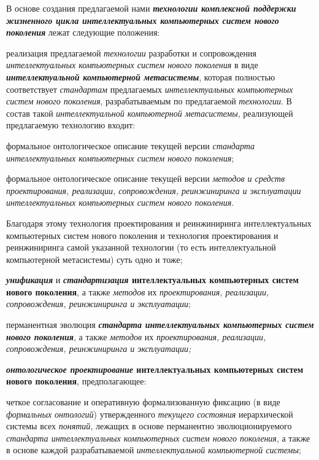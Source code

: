 В основе создания предлагаемой нами \textbf{\textit{технологии комплексной поддержки жизненного цикла интеллектуальных компьютерных систем нового поколения}} лежат следующие положения:
\begin{textitemize}
	\item реализация предлагаемой \textit{технологии} разработки и сопровождения \textit{интеллектуальных компьютерных систем нового поколения} в виде \textbf{\textit{интеллектуальной компьютерной метасистемы}}, которая полностью соответствует \textit{стандартам} предлагаемых \textit{интеллектуальных компьютерных систем нового поколения}, разрабатываемым по предлагаемой \textit{технологии}. В состав такой \textit{интеллектуальной компьютерной метасистемы}, реализующей предлагаемую технологию входит:
	\begin{textitemize}
		\item  формальное онтологическое описание текущей версии \textit{стандарта интеллектуальных компьютерных систем нового поколения};
		\item  формальное онтологическое описание текущей версии \textit{методов и средств проектирования, реализации, сопровождения, реинжиниринга и эксплуатации интеллектуальных компьютерных систем нового поколения}.
	\end{textitemize}
	Благодаря этому технология проектирования и реинжиниринга интеллектуальных компьютерных систем нового поколения и технология проектирования и реинжиниринга самой указанной технологии (то есть интеллектуальной компьютерной метасистемы) суть одно и тоже;\\
	
	\item \textbf{\textit{унификация}} и \textbf{\textit{стандартизация} интеллектуальных компьютерных систем нового поколения}, а также \textit{методов} их \textit{проектирования, реализации, сопровождения, реинжиниринга и эксплуатации};
	\item перманентная эволюция \textbf{\textit{стандарта интеллектуальных компьютерных систем нового поколения}}, а также \textit{методов} их \textit{проектирования, реализации, сопровождения, реинжиниринга и эксплуатации;}
	\item \textbf{\textit{онтологическое проектирование} интеллектуальных компьютерных систем нового поколения}, предполагающее:
	
	\begin{textitemize}
		\item  четкое согласование и оперативную формализованную фиксацию (в виде \textit{формальных онтологий}) утвержденного \textit{текущего состояния} иерархической системы всех \textit{понятий}, лежащих в основе перманентно эволюционируемого \textit{стандарта интеллектуальных компьютерных систем нового поколения}, а также в основе каждой разрабатываемой \textit{интеллектуальной компьютерной системы};
		

\end{textitemize}
\end{textitemize}
